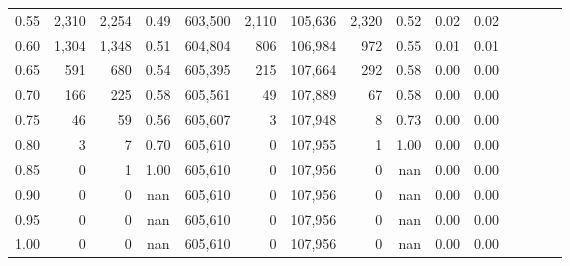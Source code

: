 \begin{tabular}{rrrcrrrrrrrrrrr}
0.55 &    2,310 &   2,254 &                                       0.49 &  603,500 &    2,110 &  105,636 &    2,320 &  0.52 &  0.02 &                         0.02 \\
0.60 &    1,304 &   1,348 &                                       0.51 &  604,804 &      806 &  106,984 &      972 &  0.55 &  0.01 &                         0.01 \\
0.65 &      591 &     680 &                                       0.54 &  605,395 &      215 &  107,664 &      292 &  0.58 &  0.00 &                         0.00 \\
0.70 &      166 &     225 &                                       0.58 &  605,561 &       49 &  107,889 &       67 &  0.58 &  0.00 &                         0.00 \\
0.75 &       46 &      59 &                                       0.56 &  605,607 &        3 &  107,948 &        8 &  0.73 &  0.00 &                         0.00 \\
0.80 &        3 &       7 &                                       0.70 &  605,610 &        0 &  107,955 &        1 &  1.00 &  0.00 &                         0.00 \\
0.85 &        0 &       1 &                                       1.00 &  605,610 &        0 &  107,956 &        0 &   nan &  0.00 &                         0.00 \\
0.90 &        0 &       0 &                                        nan &  605,610 &        0 &  107,956 &        0 &   nan &  0.00 &                         0.00 \\
0.95 &        0 &       0 &                                        nan &  605,610 &        0 &  107,956 &        0 &   nan &  0.00 &                         0.00 \\
1.00 &        0 &       0 &                                        nan &  605,610 &        0 &  107,956 &        0 &   nan &  0.00 &                         0.00 \\
\bottomrule
\end{tabular}
